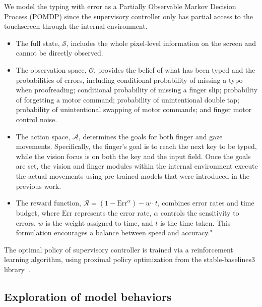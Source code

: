 We model the typing with error as a Partially Observable Markov Decision Process (POMDP) since the supervisory controller only has partial access to the touchscreen through the internal environment. 
\begin{itemize}
    \item The full state, $\mathcal{S}$, includes the whole pixel-level information on the screen and cannot be directly observed.
    \item The observation space, $\mathcal{O}$, provides the belief of what has been typed and the probabilities of errors, including conditional probability of missing a typo when proofreading; conditional probability of missing a finger slip; probability of forgetting a motor command; probability of unintentional double tap; probability of unintentional swapping of motor commands; and finger motor control noise.
    \item The action space, $\mathcal{A}$, determines the goals for both finger and gaze movements. Specifically, the finger's goal is to reach the next key to be typed, while the vision focus is on both the key and the input field. Once the goals are set, the vision and finger modules within the internal environment execute the actual movements using pre-trained models that were introduced in the previous work.
    \item The reward function, $\mathcal{R} = (1 - \text{Err}^{\alpha}) - w \cdot t$, combines error rates and time budget, where $\text{Err}$ represents the error rate, $\alpha$ controls the sensitivity to errors, $w$ is the weight assigned to time, and $t$ is the time taken. This formulation encourages a balance between speed and accuracy."
\end{itemize}
The optimal policy of supervisory controller is trained via a reinforcement learning algorithm, using proximal policy optimization from the stable-baselines3 library~\cite{schulman2017proximal}.

\subsection{Exploration of model behaviors}
\label{sec:exploration}

